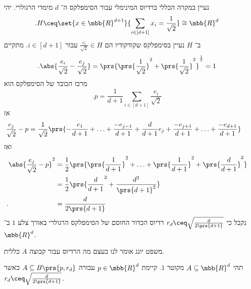 \documentclass[a4paper,10pt,twoside,openany]{book}
\begin{document}
נעיין במקרה הכללי ברדיוס המינימלי עבור הסימפלקס ה־%
$d$
מימדי הרגולרי.
יהי
\[\text{.} H \ceq \set{x \in \mbb{R}^{d+1}}{\sum_{i \in [d+1]} x_i = \frac{1}{\sqrt{2}}} \cong \mbb{R}^d\]
ב־%
$H$
נעיין בסימפלקס שקודקודיו הם
$\frac{e_i}{\sqrt{2}} \in H$
עבור
$i \in [d+1]$.
מתקיים
\[\text{.} \abs{\frac{e_i}{\sqrt{2}} - \frac{e_j}{\sqrt{2}}} = \prs{\prs{\frac{1}{\sqrt{2}}}^2 + \prs{\frac{1}{\sqrt{2}}}^2}^{\frac{1}{2}} = 1\]
מרכז הכובד של הסימפלקס הוא
\[\text{.} p = \frac{1}{d+1} \sum_{i \in [d+1]} \frac{e_i}{\sqrt{2}}\]
אז
\begin{align*}
\frac{e_j}{\sqrt{2}} - p &= \frac{1}{\sqrt{2}} \prs{- \frac{e_1}{d+1} + \ldots + \frac{-e_{j-1}}{d+1} + \frac{d}{d+1} e_j + \frac{-e_{j+1}}{d+1} + \ldots + \frac{-e_{d+1}}{d+1}}
\end{align*}
ואז
\begin{align*}
\abs{\frac{e_j}{\sqrt{2}} - p}^2 &= \frac{1}{2} \prs{\prs{\frac{1}{d+1}}^2 + \ldots + \prs{\frac{1}{d+1}}^2 + \prs{\frac{d}{d+1}}^2}
\\&= \frac{1}{2} \prs{\frac{d}{d+1}^2 + \frac{d^2}{\prs{d+1}^2}}
\\ \text{.} \hphantom{\abs{\frac{e_j}{\sqrt{2}} - p}^2} &= \frac{d}{2 \prs{d+1}}
\end{align*}
נקבל כי
$r_d \ceq \sqrt{\frac{d}{2\prs{d+1}}}$
רדיוס הכדור החוסם של הסימפלקס הרגולרי באורך צלע
$1$
ב־%
$\mbb{R}^d$.

משפט יונג אומר לנו בעצם מה הרדיוס עבור קבוצה
$A$
כללית.

\begin{theorem}[יונג]
תהי
$A \subseteq \mbb{R}^d$
מקוטר
$1$.
קיימת
$p \in \mbb{R}^d$
עבורה
$A \subseteq B\prs{p,r_d}$
כאשר
$r_d \ceq \sqrt{\frac{d}{2\prs{d+1}}}$.
\end{theorem}
\end{document}
